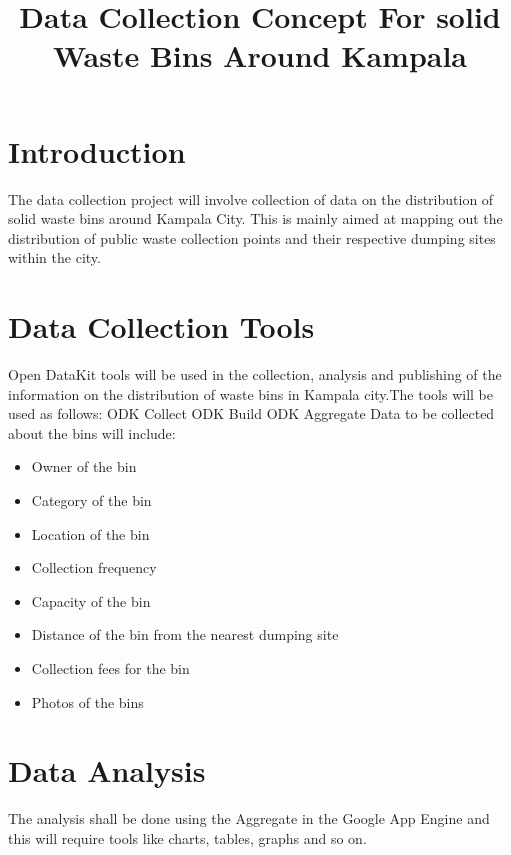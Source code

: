\documentclass[a4paper,12pt]{article}
\begin{document}
\title{Data Collection Concept For solid Waste Bins Around Kampala}
\maketitle
\section{Introduction}
The data collection project will involve collection of data on the distribution of solid waste bins around Kampala City. This is mainly aimed at mapping out the distribution of public waste collection points and their respective dumping sites within the city.

\section{Data Collection Tools}
Open DataKit tools will be used in the collection, analysis and publishing of the information on the distribution of waste bins in Kampala city.The tools will be used as follows:
ODK Collect
ODK Build
ODK Aggregate
Data to be collected about the bins will include:
\begin{itemize}
  \item Owner of the bin
  \item Category of the bin
  \item Location of the bin
  \item Collection frequency
  \item Capacity of the bin
  \item Distance of the bin from the nearest dumping site
  \item Collection fees for the bin
  \item Photos of the bins
  
\end{itemize}
\section{Data Analysis}
The analysis shall be done using the Aggregate in the Google App Engine and this will require tools like charts, tables, graphs and so on.
\end{document}
